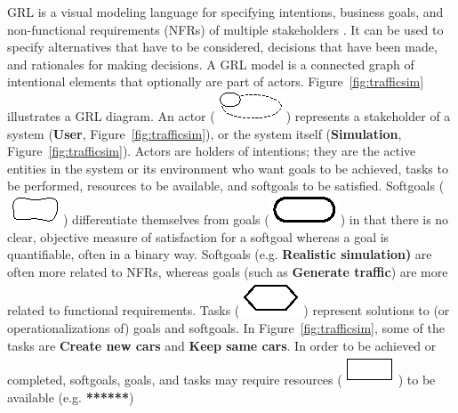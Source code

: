 GRL is a visual modeling language for specifying intentions, business goals, and non-functional requirements (NFRs) of multiple stakeholders \cite{Amyot:2010:EGM:1841349.1841356}. It can be used to specify alternatives that have to be considered, decisions that have been made, and rationales for making decisions. A GRL model is a connected graph of intentional elements that optionally are part of actors. Figure~\ref{fig:trafficsim} illustrates a GRL diagram. An actor (\includegraphics[scale=1]{img/actor}) represents a stakeholder of a system (\textbf{User}, Figure~\ref{fig:trafficsim}), or the system itself (\textbf{Simulation}, Figure~\ref{fig:trafficsim}). Actors are holders of intentions; they are the active entities in the system or its environment who want goals to be achieved, tasks to be performed, resources to be available, and softgoals to be satisfied. Softgoals (\includegraphics[scale=1]{img/softgoal}) differentiate themselves from goals (\includegraphics[scale=1]{img/goal}) in that there is no clear, objective measure of satisfaction for a softgoal whereas a goal is quantifiable, often in a binary way. Softgoals (e.g. \textbf{Realistic simulation)} are often more related to NFRs, whereas goals (such as \textbf{Generate traffic}) are more related to functional requirements. Tasks (\includegraphics[scale=1]{img/task}) represent solutions to (or operationalizations of) goals and softgoals. In Figure~\ref{fig:trafficsim}, some of the tasks are \textbf{Create new cars} and \textbf{Keep same cars}. In order to be achieved or completed, softgoals, goals, and tasks may require resources (\includegraphics[scale=1]{img/resource}) to be available (e.g. \textbf{******})

